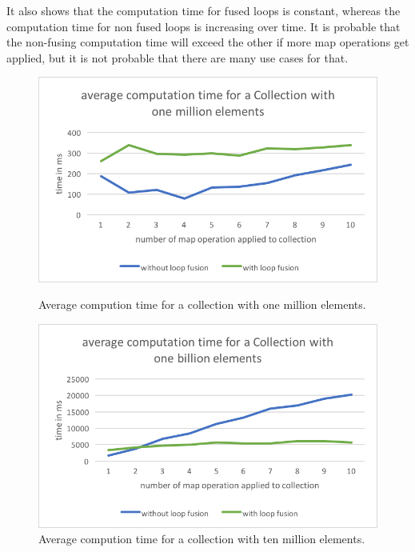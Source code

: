 \documentclass[runningheads,a4paper]{llncs}
\begin{document}
It also shows that the computation time for fused loops is constant, whereas the computation time for non fused loops is increasing over time.
It is probable that the non-fusing computation time will exceed the other if more map operations get applied, but it is not probable that there are many use cases for that.
\\
\begin{figure}[ht]
  \centering
  \begin{minipage}[b]{0.49\textwidth}
    \includegraphics[width=\textwidth]{graphics/million.png}
    \caption{Average compution time for a collection with one million elements.}
    \label{fig:million}
  \end{minipage}
  \hfill
  \begin{minipage}[b]{0.49\textwidth}
    \includegraphics[width=\textwidth]{graphics/billion.png}
    \caption{Average compution time for a collection with ten million elements.}
    \label{fig:ten million}
  \end{minipage}
\end{figure}
\end{document}
